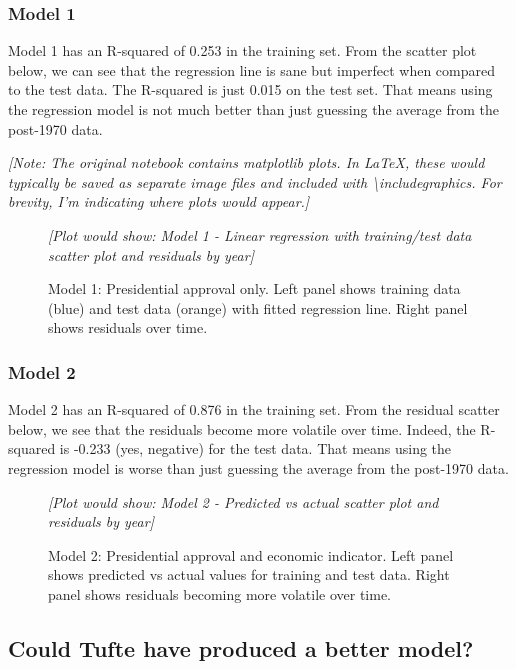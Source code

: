 \subsubsection{Model 1}

Model 1 has an R-squared of 0.253 in the training set. From the scatter plot below, we can see that the regression line is sane but imperfect when compared to the test data. The R-squared is just 0.015 on the test set. That means using the regression model is not much better than just guessing the average from the post-1970 data.

\textit{[Note: The original notebook contains matplotlib plots. In LaTeX, these would typically be saved as separate image files and included with \textbackslash includegraphics. For brevity, I'm indicating where plots would appear.]}

\begin{figure}[H]
\centering
\textit{[Plot would show: Model 1 - Linear regression with training/test data scatter plot and residuals by year]}
\caption{Model 1: Presidential approval only. Left panel shows training data (blue) and test data (orange) with fitted regression line. Right panel shows residuals over time.}
\end{figure}

\subsubsection{Model 2}

Model 2 has an R-squared of 0.876 in the training set. From the residual scatter below, we see that the residuals become more volatile over time. Indeed, the R-squared is -0.233 (yes, negative) for the test data. That means using the regression model is worse than just guessing the average from the post-1970 data.

\begin{figure}[H]
\centering
\textit{[Plot would show: Model 2 - Predicted vs actual scatter plot and residuals by year]}
\caption{Model 2: Presidential approval and economic indicator. Left panel shows predicted vs actual values for training and test data. Right panel shows residuals becoming more volatile over time.}
\end{figure}

\subsection{Could Tufte have produced a better model?}

